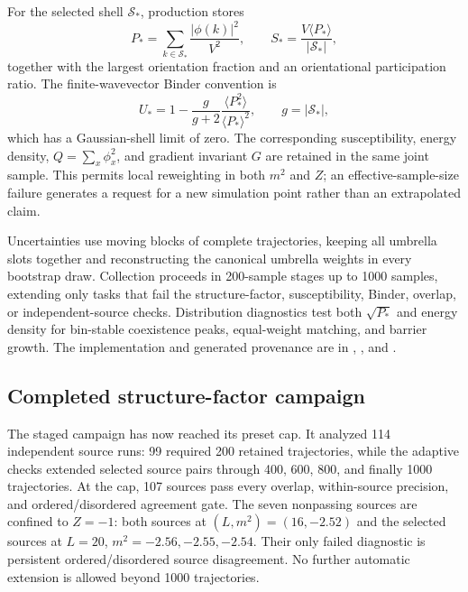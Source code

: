 \documentclass[11pt]{article}
\begin{document}
For the selected shell $\mathcal S_*$, production stores
\begin{equation}
  P_* = \sum_{k\in\mathcal S_*}\frac{|\phi(k)|^2}{V^2},
  \qquad
  S_* = \frac{V\langle P_*\rangle}{|\mathcal S_*|},
\end{equation}
together with the largest orientation fraction and an orientational
participation ratio.  The finite-wavevector Binder convention is
\begin{equation}
  U_* = 1-\frac{g}{g+2}
  \frac{\langle P_*^2\rangle}{\langle P_*\rangle^2},
  \qquad g=|\mathcal S_*|,
\end{equation}
which has a Gaussian-shell limit of zero.  The corresponding susceptibility,
energy density, $Q=\sum_x\phi_x^2$, and gradient invariant $G$ are retained in
the same joint sample.  This permits local reweighting in both $m^2$ and $Z$;
an effective-sample-size failure generates a request for a new simulation point
rather than an extrapolated claim.

Uncertainties use moving blocks of complete trajectories, keeping all umbrella
slots together and reconstructing the canonical umbrella weights in every
bootstrap draw.  Collection proceeds in 200-sample stages up to 1000 samples,
extending only tasks that fail the structure-factor, susceptibility, Binder,
overlap, or independent-source checks.  Distribution diagnostics test both
$\sqrt{P_*}$ and energy density for bin-stable coexistence peaks, equal-weight
matching, and barrier growth.  The implementation and generated provenance are
in ,
, and
.

\subsection{Completed structure-factor campaign}

The staged campaign has now reached its preset cap.  It analyzed 114 independent
source runs: 99 required 200 retained trajectories, while the adaptive checks
extended selected source pairs through 400, 600, 800, and finally 1000
trajectories.  At the cap, 107 sources pass every overlap, within-source
precision, and ordered/disordered agreement gate.  The seven nonpassing sources
are confined to $Z=-1$: both sources at $(L,m^2)=(16,-2.52)$ and the selected
sources at $L=20$, $m^2=-2.56,-2.55,-2.54$.  Their only failed diagnostic is
persistent ordered/disordered source disagreement.  No further automatic
extension is allowed beyond 1000 trajectories.
\end{document}
